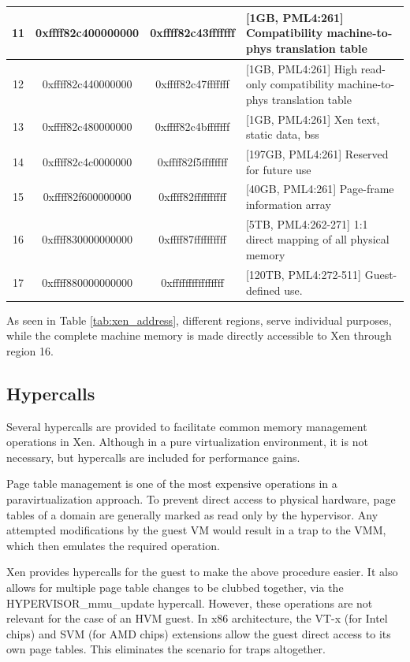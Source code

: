 \begin{longtable}[htp!]{|c|c|c|m{}|}
    \hline
    11 & 0xffff82c400000000  & 0xffff82c43fffffff & [1GB, PML4:261] Compatibility machine-to-phys translation table \\
    \hline
    12 & 0xffff82c440000000  & 0xffff82c47fffffff & [1GB, PML4:261] High read-only compatibility machine-to-phys translation table \\
    \hline
    13 & 0xffff82c480000000  & 0xffff82c4bfffffff & [1GB, PML4:261] Xen text, static data, bss \\
    \hline
    14 & 0xffff82c4c0000000  & 0xffff82f5ffffffff & [197GB, PML4:261] Reserved for future use \\
    \hline
    15 & 0xffff82f600000000  & 0xffff82ffffffffff & [40GB, PML4:261] Page-frame information array \\
    \hline
    16 & 0xffff830000000000  & 0xffff87ffffffffff & [5TB, PML4:262-271] 1:1 direct mapping of all physical memory\\
    \hline
    17 & 0xffff880000000000  & 0xffffffffffffffff & [120TB, PML4:272-511] Guest-defined use.  \\
\end{longtable}

As seen in Table \ref{tab:xen_address}, different regions, serve individual purposes, while the complete machine memory is made directly accessible to Xen through region 16. 

\subsection{Hypercalls}

Several hypercalls are provided to facilitate common memory management operations in Xen. Although in a pure virtualization environment, it is not necessary, but hypercalls are included for performance gains.

Page table management is one of the most expensive operations in a paravirtualization approach. To prevent direct access to physical hardware, page tables of a domain are generally marked as read only by the hypervisor. Any attempted modifications by the guest VM would result in a trap to the VMM, which then emulates the required operation.

Xen provides hypercalls for the guest to make the above procedure easier. It also allows for multiple page table changes to be clubbed together, via the HYPERVISOR\_mmu\_update hypercall. However, these operations are not relevant for the case of an HVM guest. In x86 architecture, the VT-x (for Intel chips) and SVM (for AMD chips) extensions allow the guest direct access to its own page tables. This eliminates the scenario for traps altogether.

